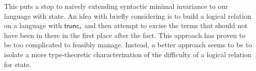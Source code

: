 This puts a stop to naively extending syntactic minimal invariance to
our language with state. An idea with briefly considering is to build
a logical relation on a language with $\mathsf{trunc}_i$ and then attempt to
excise the terms that should not have been in there in the first place
after the fact. This approach has proven to be too complicated to
feasibly manage. Instead, a better approach seems to be to isolate a
more type-theoretic characterization of the difficulty of a logical
relation for state.

